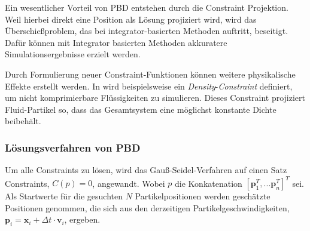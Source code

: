 Ein wesentlicher Vorteil von PBD entstehen durch die Constraint Projektion. 
Weil hierbei direkt eine Position als Lösung projiziert wird,
wird das Überschießproblem, das bei integrator-basierten Methoden 
auftritt, beseitigt. 
Dafür können mit Integrator basierten Methoden akkuratere Simulationsergebnisse erzielt werden.

Durch Formulierung neuer Constraint-Funktionen können weitere physikalische Effekte erstellt werden. In \cite{UPP} wird beispielsweise ein \newline \textit{Density}-\textit{Constraint} definiert, um nicht komprimierbare Flüssigkeiten zu simulieren. Dieses Constraint projiziert Fluid-Partikel so, dass das Gesamtsystem eine möglichst konstante Dichte beibehält.



\subsubsection{Lösungsverfahren von PBD}

Um alle Constraints zu lösen, wird das Gauß-Seidel-Verfahren auf einen Satz Constraints, $C(p)=0$, angewandt. Wobei $p$ die Konkatenation $[\textbf{p}_1^T,...\textbf{p}_n^T]^T$ sei.
Als Startwerte für die gesuchten $N$ Partikelpositionen werden geschätzte Positionen genommen, die sich aus den derzeitigen Partikelgeschwindigkeiten, $\textbf{p}_i = \textbf{x}_i + \Delta t \cdot \textbf{v}_i$, ergeben. 

